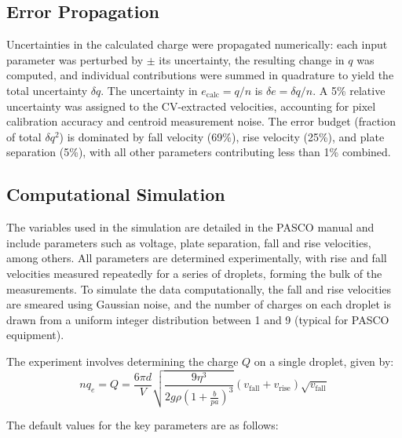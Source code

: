 \documentclass[%
 reprint,
 amsmath,amssymb,
 aps,
]{revtex4-2}
\begin{document}
\subsection{Error Propagation}

Uncertainties in the calculated charge were propagated numerically: each input parameter was perturbed by $\pm$ its uncertainty, the resulting change in $q$ was computed, and individual contributions were summed in quadrature to yield the total uncertainty $\delta q$. The uncertainty in $e_{\text{calc}} = q/n$ is $\delta e = \delta q / n$. A 5\% relative uncertainty was assigned to the CV-extracted velocities, accounting for pixel calibration accuracy and centroid measurement noise. The error budget (fraction of total $\delta q^2$) is dominated by fall velocity (69\%), rise velocity (25\%), and plate separation (5\%), with all other parameters contributing less than 1\% combined.

\subsection{Computational Simulation}

The variables used in the simulation are detailed in the PASCO manual and include parameters such as voltage, plate separation, fall and rise velocities, among others. All parameters are determined experimentally, with rise and fall velocities measured repeatedly for a series of droplets, forming the bulk of the measurements. To simulate the data computationally, the fall and rise velocities are smeared using Gaussian noise, and the number of charges on each droplet is drawn from a uniform integer distribution between 1 and 9 (typical for PASCO equipment).

The experiment involves determining the charge \(Q\) on a single droplet, given by:
\[
n q_e = Q = \frac{6 \pi d}{V} \sqrt{ \frac{9 \eta^3}{2 g \rho \left(1 + \frac{b}{p a}\right)^3} } \left( v_{\text{fall}} + v_{\text{rise}} \right) \sqrt{v_{\text{fall}}}
\]

The default values for the key parameters are as follows:
\end{document}
